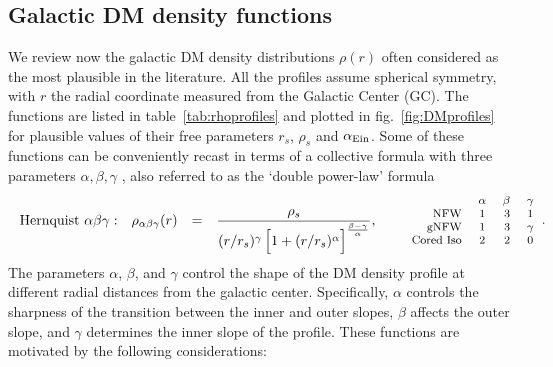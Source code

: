 \subsection{Galactic DM density functions}\label{rho(r)}
We review now the galactic DM density distributions $\rho(r)$ often considered as the most plausible in the literature.
All the profiles assume spherical symmetry, with $r$ the radial coordinate measured from the Galactic Center (GC). 
The functions are listed in table~\ref{tab:rhoprofiles}
and plotted in fig.~\ref{fig:DMprofiles} for plausible values of their free parameters $r_s$, $\rho_s$ and $\alpha_{\rm Ein}$.
Some of these functions can be conveniently recast in terms of a collective formula with three parameters $\alpha, \beta, \gamma$ \cite{profilesabc}, also referred to as the `double power-law' formula 
\begin{equation}
\begin{array}{rrclr} 
    {\rm Hernquist} \ \alpha\beta\gamma: & \rho_{\alpha\beta\gamma}(r) & = &  \displaystyle  \frac{\rho_{s}}{(r/r_s)^\gamma \, \Big[1+(r/r_s)^\alpha \Big]^{\frac{\beta-\gamma}{\alpha}} },
    & \quad 
    \begin{minipage}{0.2\textwidth}
\footnotesize{  
\begin{tabular}{rcrc}
 & $\alpha$ & $\beta$ & $\gamma$ \\
  NFW & 1 & 3 & 1 \\
  gNFW & 1 & 3 & $\gamma$ \\
  Cored Iso & 2 & 2 & 0 
 \end{tabular}}.
\end{minipage}
 \end{array}
\label{eq:profilesabc}
\end{equation} 
The parameters $\alpha$, $\beta$, and $\gamma$ control the shape of the DM density profile at different radial distances from the galactic center.
Specifically, $\alpha$ controls the sharpness of the transition between the inner and outer slopes, $\beta$ affects the outer slope, and $\gamma$ determines the inner slope of the profile.
These functions are motivated by the following considerations:

